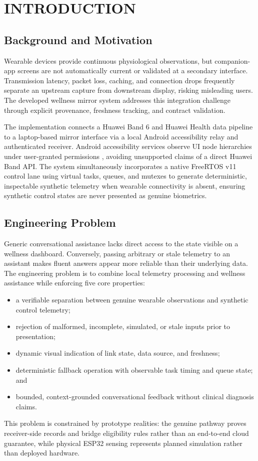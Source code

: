 \chapter{INTRODUCTION}

\section{Background and Motivation}
Wearable devices provide continuous physiological observations, but companion-app screens are not automatically current or validated at a secondary interface. Transmission latency, packet loss, caching, and connection drops frequently separate an upstream capture from downstream display, risking misleading users. The developed wellness mirror system addresses this integration challenge through explicit provenance, freshness tracking, and contract validation.

The implementation connects a Huawei Band 6 and Huawei Health data pipeline to a laptop-based mirror interface via a local Android accessibility relay and authenticated receiver. Android accessibility services observe UI node hierarchies under user-granted permissions \cite{androidAccessibility}, avoiding unsupported claims of a direct Huawei Band API. The system simultaneously incorporates a native FreeRTOS v11 control lane using virtual tasks, queues, and mutexes \cite{freertosQueues,freertosMutex} to generate deterministic, inspectable synthetic telemetry when wearable connectivity is absent, ensuring synthetic control states are never presented as genuine biometrics.

\section{Engineering Problem}
Generic conversational assistance lacks direct access to the state visible on a wellness dashboard. Conversely, passing arbitrary or stale telemetry to an assistant makes fluent answers appear more reliable than their underlying data. The engineering problem is to combine local telemetry processing and wellness assistance while enforcing five core properties:
\begin{itemize}[noitemsep,topsep=1pt]
  \item a verifiable separation between genuine wearable observations and synthetic control telemetry;
  \item rejection of malformed, incomplete, simulated, or stale inputs prior to presentation;
  \item dynamic visual indication of link state, data source, and freshness;
  \item deterministic fallback operation with observable task timing and queue state; and
  \item bounded, context-grounded conversational feedback without clinical diagnosis claims.
\end{itemize}
This problem is constrained by prototype realities: the genuine pathway proves receiver-side records and bridge eligibility rules rather than an end-to-end cloud guarantee, while physical ESP32 sensing represents planned simulation rather than deployed hardware.

